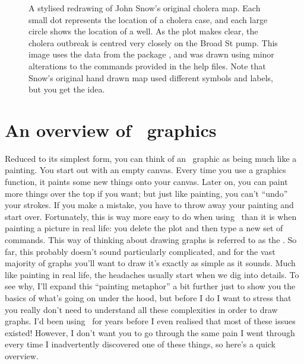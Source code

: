 \begin{figure}[t!!]
\begin{center}
\caption{A stylised redrawing of John Snow's original cholera map. Each small dot represents the location of a cholera case, and each large circle shows the location of a well. As the plot makes clear, the cholera outbreak is centred very closely on the Broad St pump.  This image uses the data from the  package \protect\cite{Friendly2011}, and was drawn using minor alterations to the commands provided in the help files. Note that Snow's original hand drawn map used different symbols and labels, but you get the idea.}
\label{fig:snowmap1}
\HR
\end{center}
\end{figure}




\section{An overview of \R\ graphics\label{sec:rgraphics}}

Reduced to its simplest form, you can think of an \R\ graphic as being much like a painting. You start out with an empty canvas. Every time you use a graphics function, it paints some new things onto your canvas. Later on, you can paint more things over the top if you want; but just like painting, you can't ``undo'' your strokes. If you make a mistake, you have to throw away your painting and start over. Fortunately, this is way more easy to do when using \R\ than it is when painting a picture in real life: you delete the plot and then type a new set of commands. This way of thinking about drawing graphs is referred to as the . So far, this probably doesn't sound particularly complicated, and for the vast majority of graphs you'll want to draw it's exactly as simple as it sounds. Much like painting in real life, the headaches usually start when we dig into details. To see why, I'll  expand this ``painting metaphor'' a bit further just to show you the basics of what's going on under the hood, but before I do I want to stress that you really don't need to understand all these complexities in order to draw graphs. I'd been using \R\ for years before I even realised that most of these issues existed! However, I don't want you to go through the same pain I went through every time I inadvertently discovered one of these things, so here's a quick overview.

